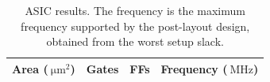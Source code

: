 %

\ifdefined\ASIC
\begin{table}[H]
\centering
\begin{tabular}{|c|c|c|c|}
\hline
\rowcolor{iob-green}
\textbf{Area} ($\SI{}{\micro\meter\squared}$)  & \textbf{Gates}  & \textbf{FFs}  & \textbf{Frequency} ($\SI{}{\mega\hertz}$)\\
\hline
\hline

\end{tabular}
\caption{ASIC results. The frequency is the maximum frequency supported by the
post-layout design, obtained from the worst setup slack.}
\label{tab:asic_results}
\end{table}
\fi
